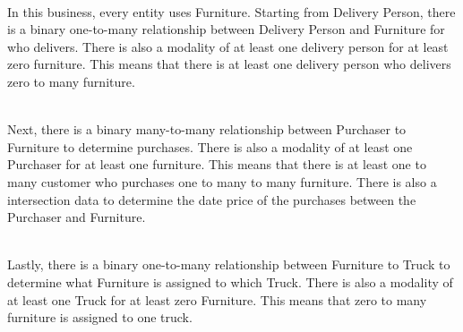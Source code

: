 \documentclass{article}
\begin{document}
\noindent\\
In this business, every entity uses Furniture. Starting from Delivery Person, there is a binary one-to-many relationship between Delivery Person and Furniture for who delivers. There is also a modality of at least one delivery person for at least zero furniture. This means that there is at least one delivery person who delivers zero to many furniture.

\noindent\\
Next, there is a binary many-to-many relationship between Purchaser to Furniture to determine purchases. There is also a modality of at least one Purchaser for at least one furniture. This means that there is at least one to many customer who purchases one to many to many furniture. There is also a intersection data to determine the date price of the purchases between the Purchaser and Furniture.

\noindent\\
Lastly, there is a binary one-to-many relationship between Furniture to Truck to determine what Furniture is assigned to which Truck. There is also a modality of at least one Truck for at least zero Furniture. This means that zero to many furniture is assigned to one truck.
\end{document}
